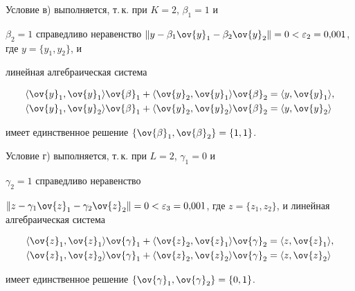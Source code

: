 \begin{exam}
Условие в) выполняется, т.\,к. при $K=2$, $\beta_1=1$ и


$\beta_2=1$ справедливо неравенство $\|y-\beta_1\ov{y}_1 -


\beta_2\ov{y}_2\|=0<\varepsilon_2=0{,}001$, где $y=\{y_1,y_2\}$, и


линейная алгебраическая система


\begin{align*}


\langle\ov{y}_1, \ov{y}_1\rangle\ov{\beta}_1+


\langle\ov{y}_2, \ov{y}_1\rangle\ov{\beta}_2 &= \langle


y,\ov{y}_1\rangle,\\


\langle\ov{y}_1, \ov{y}_2\rangle\ov{\beta}_1+


\langle\ov{y}_2, \ov{y}_2\rangle\ov{\beta}_2 &= \langle


y,\ov{y}_2\rangle


\end{align*}


имеет единственное решение $\{\ov{\beta}_1, \ov{\beta}_2\}=


\{1,1\}$.





Условие г) выполняется, т.\,к. при $L=2$, $\gamma_1=0$ и


$\gamma_2=1$ справедливо неравенство


$\|z-\gamma_1\ov{z}_1-\gamma_2\ov{z}_2\|=0<\varepsilon_3 =


0{,}001$, где $z=\{z_1,z_2\}$, и линейная алгебраическая система


\begin{align*}


\langle\ov{z}_1,\ov{z}_1\rangle\ov{\gamma}_1+


\langle\ov{z}_2,\ov{z}_1\rangle\ov{\gamma}_2 &= \langle


z,\ov{z}_1\rangle,\\


\langle\ov{z}_1,\ov{z}_2\rangle\ov{\gamma}_1+


\langle\ov{z}_2,\ov{z}_2\rangle\ov{\gamma}_2 &= \langle


z,\ov{z}_2\rangle


\end{align*}


имеет единственное решение $\{\ov{\gamma}_1,\ov{\gamma}_2\} =


\{0,1\}$.






\end{exam}
